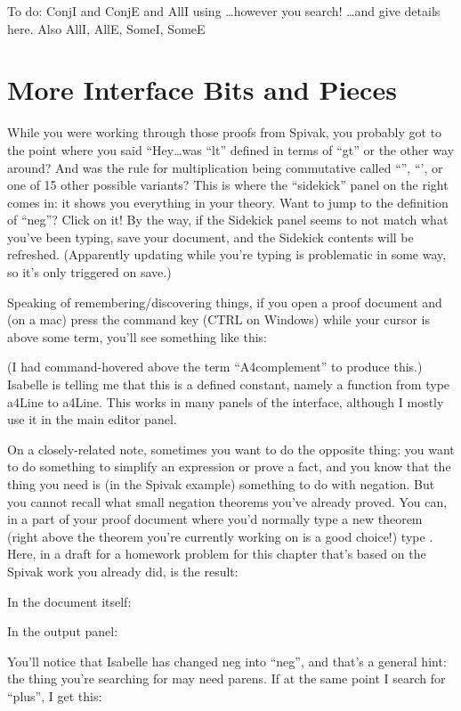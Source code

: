 To do: ConjI and ConjE and AllI using \ldots however you search! \ldots  and give details here. Also AllI, AllE, SomeI, SomeE

\section{More Interface Bits and Pieces}

While you were working through those proofs from Spivak, you probably got to the point where you said ``Hey\ldots was ``lt'' defined in terms of ``gt'' or the other way around? And was the rule for multiplication being commutative called ``'', ``', or one of 15 other possible variants? This is where the ``sidekick'' panel on the right comes in: it shows you everything in your theory. Want to jump to the definition of ``neg''? Click on it! By the way, if the Sidekick panel seems to not match what you've been typing, save your document, and the Sidekick contents will be refreshed. (Apparently updating while you're typing is problematic in some way, so it's only triggered on save.)

Speaking of remembering/discovering things, if you open a proof document and (on a mac) press the command key (CTRL on Windows) while your cursor is above some term, you'll see something like this:



(I had command-hovered above the term ``A4complement'' to produce this.) Isabelle is telling me that this is a defined constant, namely a function from type a4Line to a4Line. This works in many panels of the interface, although I mostly use it in the main editor panel. 

On a closely-related note, sometimes you want to do the opposite thing: you want to do something to simplify an expression or prove a fact, and you know that the thing you need is (in the Spivak example) something to do with negation. But you cannot recall what small negation theorems you've already proved. You can, in a part of your proof document where you'd normally type a new theorem (right above the theorem you're currently working on is a good choice!) type . Here, in a draft for a homework problem for this chapter that's based on the Spivak work you already did, is the result:

In the document itself:

In the output panel:
 

You'll notice that Isabelle has changed neg into ``neg'', and that's a general hint: the thing you're searching for may need parens. If at the same point I search for ``plus'', I get this:

